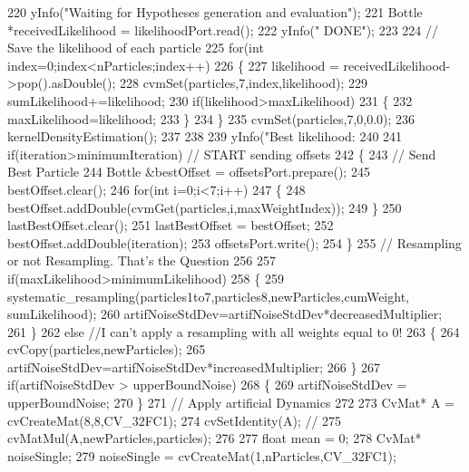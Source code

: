 \begin{DoxyCode}
220     yInfo(\textcolor{stringliteral}{"Waiting for Hypotheses generation and evaluation"});
221     Bottle *receivedLikelihood = likelihoodPort.read();
222     yInfo(\textcolor{stringliteral}{" DONE"});
223     
224     \textcolor{comment}{// Save the likelihood of each particle}
225     \textcolor{keywordflow}{for}(\textcolor{keywordtype}{int} index=0;index<nParticles;index++) 
226     \{
227         likelihood = receivedLikelihood->pop().asDouble();
228         cvmSet(particles,7,index,likelihood);
229         sumLikelihood+=likelihood;
230         \textcolor{keywordflow}{if}(likelihood>maxLikelihood) 
231         \{
232             maxLikelihood=likelihood;
233         \}
234     \}
235     cvmSet(particles,7,0,0.0);
236     kernelDensityEstimation();
237 
238 
239     yInfo(\textcolor{stringliteral}{"Best likelihood: %
240 
241     \textcolor{keywordflow}{if}(iteration>minimumIteration) \textcolor{comment}{// START sending offsets}
242     \{
243         \textcolor{comment}{// Send Best Particle}
244         Bottle &bestOffset = offsetsPort.prepare();
245         bestOffset.clear();
246         \textcolor{keywordflow}{for}(\textcolor{keywordtype}{int} i=0;i<7;i++) 
247         \{
248             bestOffset.addDouble(cvmGet(particles,i,maxWeightIndex));
249         \}
250         lastBestOffset.clear();
251         lastBestOffset = bestOffset;
252         bestOffset.addDouble(iteration);
253         offsetsPort.write();
254     \}
255     \textcolor{comment}{// Resampling or not Resampling. That's the Question}
256 
257     \textcolor{keywordflow}{if}(maxLikelihood>minimumLikelihood) 
258     \{
259         systematic_resampling(particles1to7,particles8,newParticles,cumWeight, sumLikelihood);
260         artifNoiseStdDev=artifNoiseStdDev*decreasedMultiplier;
261     \}
262     \textcolor{keywordflow}{else}  \textcolor{comment}{//I can't apply a resampling with all weights equal to 0! }
263     \{
264         cvCopy(particles,newParticles);
265         artifNoiseStdDev=artifNoiseStdDev*increasedMultiplier;
266     \}
267     \textcolor{keywordflow}{if}(artifNoiseStdDev > upperBoundNoise) 
268     \{
269        artifNoiseStdDev = upperBoundNoise;
270     \}
271     \textcolor{comment}{// Apply artificial Dynamics}
272 
273     CvMat* A = cvCreateMat(8,8,CV\_32FC1);
274     cvSetIdentity(A); \textcolor{comment}{//}
275     cvMatMul(A,newParticles,particles);
276 
277     \textcolor{keywordtype}{float} mean = 0;
278     CvMat* noiseSingle;
279     noiseSingle = cvCreateMat(1,nParticles,CV\_32FC1);
}
\end{DoxyCode}
